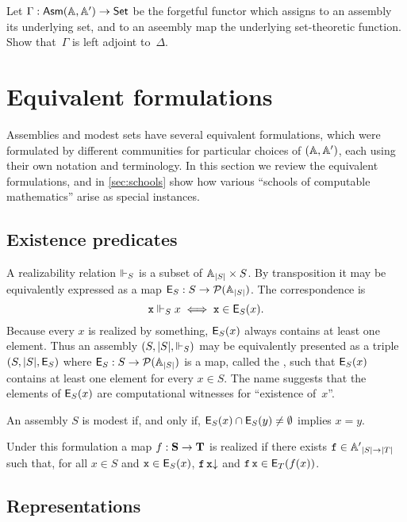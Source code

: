 \begin{exercise}
  Let $\Gamma : \mathsf{Asm}(\mathbb{A},\mathbb{A}') \to \mathsf{Set}$ be the forgetful functor which assigns to an assembly its underlying set, and to an
  aseembly map the underlying set-theoretic function. Show that~$\Gamma$ is left adjoint to~$\Delta$.
\end{exercise}


\section{Equivalent formulations}
\label{sec:equivalent-formulations}

Assemblies and modest sets have several equivalent formulations, which were formulated by different communities for particular choices of $(\mathbb{A}, \mathbb{A}')$, each using their own notation and terminology. In this section we review the equivalent formulations, and in \cref{sec:schools} show how various ``schools of computable mathematics'' arise as special instances.

\subsection{Existence predicates}
\label{sec:existence-predicates}

A realizability relation $\Vdash_S$ is a subset of ${\mathbb{A}}_{|S|} \times S$. By transposition it may be equivalently expressed
as a map $\mathsf{E}_S : S \to \mathcal{P}({\mathbb{A}}_{|S|})$. The correspondence is
%
\begin{equation*}
  \mathtt{x} \Vdash_S x \iff \mathtt{x} \in \mathsf{E}_S(x).
\end{equation*}
%
Because every $x$ is realized by something, $\mathsf{E}_S(x)$ always contains at least one element. Thus an assembly $(S, |S|, {\Vdash_{S}})$ may be equivalently presented as a triple $(S, |S|, \mathsf{E}_S)$ where $\mathsf{E}_S : S \to \mathcal{P}({\mathbb{A}}_{|S|})$ is a map, called the , such that $\mathsf{E}_S(x)$ contains at least one element for every $x \in S$. The name suggests that the elements of $\mathsf{E}_S(x)$ are computational witnesses for ``existence of~$x$''.

An assembly $S$ is modest if, and only if, $\mathsf{E}_S(x) \cap \mathsf{E}_S(y) \neq \emptyset$ implies $x = y$.

Under this formulation a map $f : \mathbf{S} \to \mathbf{T}$ is realized if there exists $\mathtt{f} \in {\mathbb{A}'}_{|S| \to |T|}$ such that, for all $x \in S$ and $\mathtt{x} \in \mathsf{E}_S(x)$, $\mathtt{f}\,\mathtt{x}{\downarrow}$ and $\mathtt{f}\,\mathtt{x} \in \mathsf{E}_T(f(x))$.

\subsection{Representations}
\label{sec:representations}

